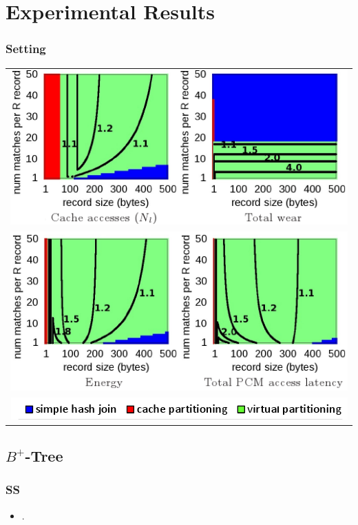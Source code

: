\section{Experimental Results}

\begin{frame}
\frametitle{Setting} %

\begin{tabular}{c}
\includegraphics[scale=0.3]{images/compair1.png} \\
\includegraphics[scale=0.3]{images/compair2.png} \\
\includegraphics[scale=0.3]{images/compair3.png}
\end{tabular}
\end{frame}

\subsection{$B^+$-Tree}

\begin{frame}
\frametitle{SS}

\begin{itemize}
\item .
\end{itemize}

\end{frame}


